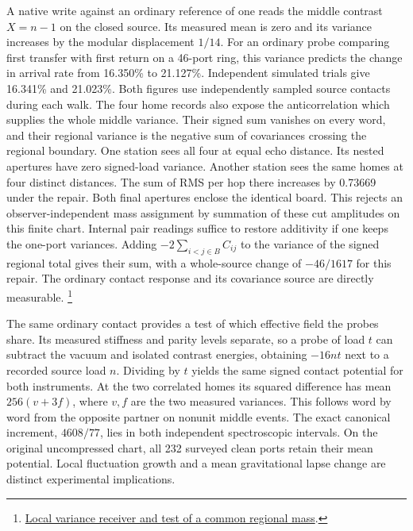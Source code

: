 \documentclass[11pt]{article}
\begin{document}
A native write against an ordinary reference of one reads the middle
contrast \(X=n-1\) on the closed source. Its measured mean is zero
and its variance increases by the modular displacement \(1/14\).
For an ordinary probe comparing first transfer with first return on
a 46-port ring, this variance predicts the change in arrival rate
from 16.350\% to 21.127\%. Independent simulated trials give
16.341\% and 21.023\%. Both figures use independently sampled source
contacts during each walk. The four home records also expose the
anticorrelation which supplies the whole middle variance. Their
signed sum vanishes on every word, and their regional variance is
the negative sum of covariances crossing the regional boundary.
One station sees all four at equal echo distance. Its nested
apertures have zero signed-load variance. Another station sees the
same homes at four distinct distances. The sum of RMS per hop there
increases by 0.73669 under the repair. Both final apertures enclose
the identical board. This rejects an observer-independent mass
assignment by summation of these cut amplitudes on this finite chart.
Internal pair readings suffice to restore additivity if one keeps the
one-port variances. Adding \(-2\sum_{i<j\in B}C_{ij}\) to the variance
of the signed regional total gives their sum, with a whole-source change
of \(-46/1617\) for this repair. The ordinary contact response and
its covariance source are directly measurable.%
\footnote{\href{https://github.com/FloatingPragma/observer-patch-holography/blob/main/model/experiments/interval_echo_shell_flux/product_address/green_response/material_recoil/overlap_source/native_boundary/stock/aperture/FLUCTUATION_RESULTS.md}{Local variance receiver and test of a common regional mass}.}

The same ordinary contact provides a test of which effective field the
probes share. Its measured stiffness and parity levels separate, so a
probe of load \(t\) can subtract the vacuum and isolated contrast
energies, obtaining \(-16nt\) next to a recorded source load \(n\).
Dividing by \(t\) yields the same signed contact potential for both
instruments. At the two correlated homes its squared difference has
mean \(256(v+3f)\), where \(v,f\) are the two measured variances.
This follows word by word from the opposite partner on nonunit middle
events. The exact canonical increment, \(4608/77\), lies in both
independent spectroscopic intervals. On the original uncompressed
chart, all 232 surveyed clean ports retain their mean potential.
Local fluctuation growth and a mean gravitational lapse change are
distinct experimental implications.
\end{document}
